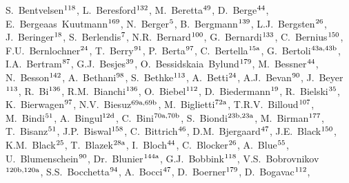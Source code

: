 \begin{flushleft}
S.~Bentvelsen$^\textrm{\scriptsize 118}$,    
L.~Beresford$^\textrm{\scriptsize 132}$,    
M.~Beretta$^\textrm{\scriptsize 49}$,    
D.~Berge$^\textrm{\scriptsize 44}$,    
E.~Bergeaas~Kuutmann$^\textrm{\scriptsize 169}$,    
N.~Berger$^\textrm{\scriptsize 5}$,    
B.~Bergmann$^\textrm{\scriptsize 139}$,    
L.J.~Bergsten$^\textrm{\scriptsize 26}$,    
J.~Beringer$^\textrm{\scriptsize 18}$,    
S.~Berlendis$^\textrm{\scriptsize 7}$,    
N.R.~Bernard$^\textrm{\scriptsize 100}$,    
G.~Bernardi$^\textrm{\scriptsize 133}$,    
C.~Bernius$^\textrm{\scriptsize 150}$,    
F.U.~Bernlochner$^\textrm{\scriptsize 24}$,    
T.~Berry$^\textrm{\scriptsize 91}$,    
P.~Berta$^\textrm{\scriptsize 97}$,    
C.~Bertella$^\textrm{\scriptsize 15a}$,    
G.~Bertoli$^\textrm{\scriptsize 43a,43b}$,    
I.A.~Bertram$^\textrm{\scriptsize 87}$,    
G.J.~Besjes$^\textrm{\scriptsize 39}$,    
O.~Bessidskaia~Bylund$^\textrm{\scriptsize 179}$,    
M.~Bessner$^\textrm{\scriptsize 44}$,    
N.~Besson$^\textrm{\scriptsize 142}$,    
A.~Bethani$^\textrm{\scriptsize 98}$,    
S.~Bethke$^\textrm{\scriptsize 113}$,    
A.~Betti$^\textrm{\scriptsize 24}$,    
A.J.~Bevan$^\textrm{\scriptsize 90}$,    
J.~Beyer$^\textrm{\scriptsize 113}$,    
R.~Bi$^\textrm{\scriptsize 136}$,    
R.M.~Bianchi$^\textrm{\scriptsize 136}$,    
O.~Biebel$^\textrm{\scriptsize 112}$,    
D.~Biedermann$^\textrm{\scriptsize 19}$,    
R.~Bielski$^\textrm{\scriptsize 35}$,    
K.~Bierwagen$^\textrm{\scriptsize 97}$,    
N.V.~Biesuz$^\textrm{\scriptsize 69a,69b}$,    
M.~Biglietti$^\textrm{\scriptsize 72a}$,    
T.R.V.~Billoud$^\textrm{\scriptsize 107}$,    
M.~Bindi$^\textrm{\scriptsize 51}$,    
A.~Bingul$^\textrm{\scriptsize 12d}$,    
C.~Bini$^\textrm{\scriptsize 70a,70b}$,    
S.~Biondi$^\textrm{\scriptsize 23b,23a}$,    
M.~Birman$^\textrm{\scriptsize 177}$,    
T.~Bisanz$^\textrm{\scriptsize 51}$,    
J.P.~Biswal$^\textrm{\scriptsize 158}$,    
C.~Bittrich$^\textrm{\scriptsize 46}$,    
D.M.~Bjergaard$^\textrm{\scriptsize 47}$,    
J.E.~Black$^\textrm{\scriptsize 150}$,    
K.M.~Black$^\textrm{\scriptsize 25}$,    
T.~Blazek$^\textrm{\scriptsize 28a}$,    
I.~Bloch$^\textrm{\scriptsize 44}$,    
C.~Blocker$^\textrm{\scriptsize 26}$,    
A.~Blue$^\textrm{\scriptsize 55}$,    
U.~Blumenschein$^\textrm{\scriptsize 90}$,    
Dr.~Blunier$^\textrm{\scriptsize 144a}$,    
G.J.~Bobbink$^\textrm{\scriptsize 118}$,    
V.S.~Bobrovnikov$^\textrm{\scriptsize 120b,120a}$,    
S.S.~Bocchetta$^\textrm{\scriptsize 94}$,    
A.~Bocci$^\textrm{\scriptsize 47}$,    
D.~Boerner$^\textrm{\scriptsize 179}$,    
D.~Bogavac$^\textrm{\scriptsize 112}$,    

\end{flushleft}

